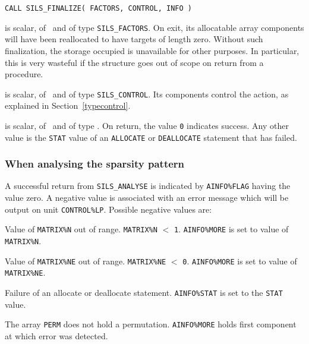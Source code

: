 \documentclass{galahad}
\newcommand{\packagename}{SILS}
\begin{document}
\hskip0.5in
{\tt CALL \packagename\_FINALIZE( FACTORS, CONTROL, INFO )}

\begin{description}
 is scalar, of \intentinout\ and of type
{\tt \packagename\_FACTORS}. On exit, its allocatable array components will have
been reallocated to have targets of length zero.  Without such
finalization, the storage occupied is unavailable for other purposes.
In particular, this is very wasteful if the structure goes out of scope
on return from a procedure.

 is scalar, of \intentin\ and of type {\tt \packagename\_CONTROL}.
Its components control the action, as explained in Section~\ref{typecontrol}.

 is scalar, of \intentout\, and of type \integer.  On return,
the value {\tt 0} indicates success. Any other value is the {\tt STAT} value of
an {\tt ALLOCATE} or {\tt DEALLOCATE} statement that has failed.

\end{description}


\galerrors
\subsubsection{When analysing the sparsity pattern}\label{erroranal}
A successful return from {\tt \packagename\_ANALYSE} is indicated by
 {\tt AINFO\%FLAG} having the value zero.  A negative value is
 associated with an error message which will  be output on unit
 {\tt CONTROL\%LP}. Possible negative values are:

\begin{description}
 Value of {\tt MATRIX\%N} out of range.  {\tt MATRIX\%N} $<$ {\tt 1}.
{\tt AINFO\%MORE} is set to value of {\tt MATRIX\%N}.

 Value of {\tt MATRIX\%NE} out of range.  {\tt MATRIX\%NE} $<$ {\tt 0}.
{\tt AINFO\%MORE} is set to value of {\tt MATRIX\%NE}.

 Failure of an allocate or deallocate statement. {\tt AINFO\%STAT}
 is set to the {\tt STAT} value.

 The array {\tt PERM} does not hold a permutation.
{\tt AINFO\%MORE} holds first component at which error was detected.

\end{description}
\end{document}
